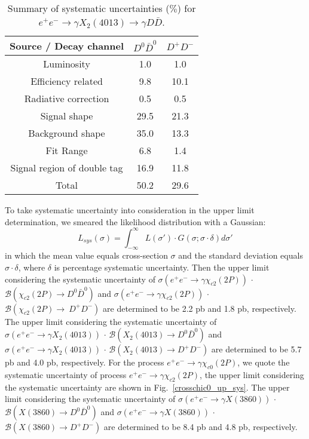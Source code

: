 \documentclass[aps,preprint,tightenlines,superscriptaddress,showpacs,byrevtex,amsmath,amssymb,nofloatfix]{revtex4}
\begin{document}
\begin{table}[!htbp]
\caption{\small Summary of systematic uncertainties ($\%$) for $e^{+}e^{-}\rightarrow \gamma X_{2}(4013)\rightarrow \gamma D\bar{D}$.}
\label{sys_err_gamX}
\begin{tabular}{c| c |c }
\hline
     Source / Decay channel     & $D^{0}\bar{D}^{0}$ &  $D^{+}D^{-}$    \\
    \hline
    Luminosity                       &1.0    &1.0      \\
    Efficiency related               &9.8	 &10.1	  	\\
    Radiative correction             &0.5    &0.5      \\
    Signal shape                      &29.5   &21.3         \\
    Background shape                 &35.0   &13.3         \\
    Fit Range                        &6.8    &1.4         \\
    Signal region of double tag      &16.9   &11.8         \\
    \hline
    Total                            &50.2   &29.6      \\
    \hline
    \hline
\end{tabular}
\end{table}


 To take systematic uncertainty into consideration in the upper limit determination, we smeared the likelihood distribution with a Gaussian:
\begin{equation}
    L_{sys}(\sigma)= \int_{-\infty}^{\infty}L(\sigma ')\cdot G(\sigma;\sigma\cdot\delta)d\sigma'
\end{equation}
in which the mean value equals cross-section $\sigma$ and the standard deviation equals $\sigma\cdot\delta$, where $\delta$ is percentage systematic uncertainty. Then the upper limit considering the systematic uncertainty of $\sigma (e^{+}e^{-}\rightarrow \gamma \chi_{c2} (2P))$ $\cdot$ $\mathcal{B}(\chi_{c2} (2P)\rightarrow D^{0}\bar{D}^{0})$  and $\sigma (e^{+}e^{-}\rightarrow \gamma \chi_{c2} (2P))$ $\cdot$ $\mathcal{B}(\chi_{c2} (2P)\rightarrow \ D^{+}D^{-})$ are determined to be 2.2 pb and 1.8 pb, respectively.  The upper limit considering the systematic uncertainty of $\sigma (e^{+}e^{-}\rightarrow \gamma X_{2}(4013))$ $\cdot$ $\mathcal{B}(X_{2}(4013)\rightarrow  D^{0}\bar{D}^{0})$  and $\sigma (e^{+}e^{-}\rightarrow \gamma X_{2}(4013))$ $\cdot$ $\mathcal{B}(X_{2}(4013)\rightarrow D^{+}D^{-})$ are determined to be 5.7 pb and 4.0 pb, respectively. For the process $e^{+}e^{-}\rightarrow \gamma \chi_{c0} (2P)$,  we quote the systematic uncertainty of process $e^{+}e^{-}\rightarrow \gamma \chi_{c2} (2P)$, the upper limit considering the systematic uncertainty are shown in Fig.~\ref{crosschic0_up_sys}. The upper limit considering the systematic uncertainty of $\sigma (e^{+}e^{-}\rightarrow \gamma X(3860))$ $\cdot$ $\mathcal{B}(X(3860)\rightarrow  D^{0}\bar{D}^{0})$  and $\sigma (e^{+}e^{-}\rightarrow \gamma X(3860))$ $\cdot$ $\mathcal{B}(X(3860)\rightarrow  D^{+}D^{-})$ are determined to be 8.4 pb and 4.8 pb, respectively.
\end{document}
